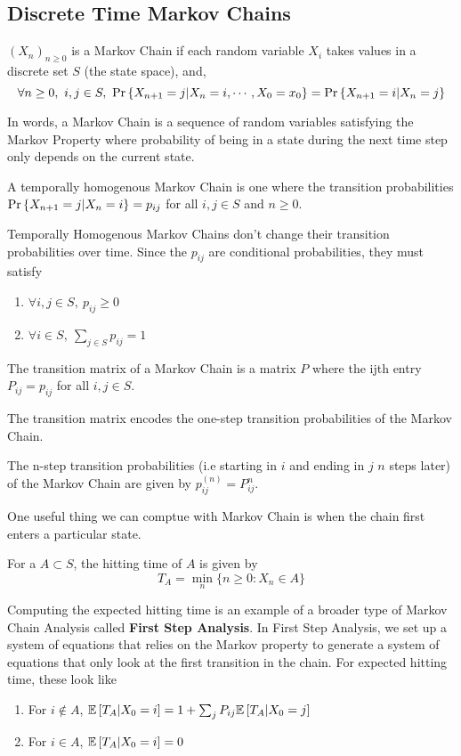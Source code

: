 \subsection{Discrete Time Markov Chains}
\begin{definition}
	$(X_n)_{n\geq 0}$ is a Markov Chain if each random variable $X_i$ takes values in a discrete set $S$ (the state space), and, \[
		\forall n \geq 0,\ i,j\in S,\ \pr{X_{n+1}=j|X_n=i,\cdots,X_0=x_0} = \pr{X_{n+1}=i|X_n=j}
	\]
	\label{defn:markov-chain}
\end{definition}
In words, a Markov Chain is a sequence of random variables satisfying the Markov Property where probability of being in a state during the next time step only depends on the current state.
\begin{definition}
	A temporally homogenous Markov Chain is one where the transition probabilities $\text{Pr}\left\{X_{n+1}=j|X_n=i\right\} = p_{ij}$ for all $i,j\in S$ and $n\geq 0$.
	\label{defn:temp-homo-markov-chain}
\end{definition}
Temporally Homogenous Markov Chains don't change their transition probabilities over time.
Since the $p_{ij}$ are conditional probabilities, they must satisfy
\begin{enumerate}
	\item $\forall i,j\in S,\ p_{ij} \geq 0$
	\item $\forall i\in S,\ \sum_{j\in S}p_{ij} = 1$
\end{enumerate}
\begin{definition}
	The transition matrix of a Markov Chain is a matrix $P$ where the ijth entry $P_{ij} = p_{ij}$ for all $i,j\in S$.
	\label{defn:transition-mat}
\end{definition}
The transition matrix encodes the one-step transition probabilities of the Markov Chain.
\begin{theorem}
	The n-step transition probabilities (i.e starting in $i$ and ending in $j$ $n$ steps later) of the Markov Chain are given by $p_{ij}^{(n)} = P^n_{ij}$.
	\label{thm:chapman-kolmogorov}
\end{theorem}
One useful thing we can comptue with Markov Chain is when the chain first enters a particular state.
\begin{definition}
	For a $A \subset S$, the hitting time of $A$ is given by \[
		T_A = \min_n \{ n\geq 0: X_n\in A\}
	\]
	\label{defn:hitting-time}
\end{definition}
Computing the expected hitting time is an example of a broader type of Markov Chain Analysis called \textbf{First Step Analysis}.
In First Step Analysis, we set up a system of equations that relies on the Markov property to generate a system of equations that only look at the first transition in the chain.
For expected hitting time, these look like
\begin{enumerate}
	\item For $i\not\in A$, $\mathbb{E}\left[T_A|X_0 = i\right] = 1 + \sum_j P_{ij} \mathbb{E}\left[T_A|X_0 = j\right]$
	\item For $i\in A$, $\mathbb{E}\left[T_A|X_0 = i\right] = 0$
\end{enumerate}
